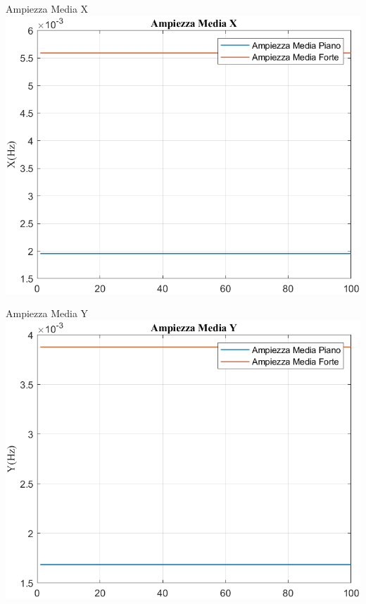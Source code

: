 	\begin{frame}{{Ampiezza Media X}}					
		\centering\includegraphics[height=.8\textheight]{figure/Vel/Trasformata/Ampiezza MediaX}
	\end{frame}
	
	\begin{frame}{{Ampiezza Media Y}}					
		\centering\includegraphics[height=.8\textheight]{figure/Vel/Trasformata/Ampiezza MediaY}
	\end{frame}
	
